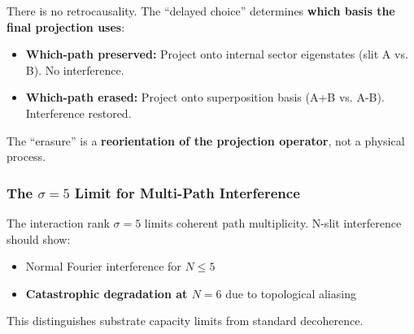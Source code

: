 There is no retrocausality. The ``delayed choice'' determines \textbf{which basis the final projection uses}:
\begin{itemize}
    \item \textbf{Which-path preserved:} Project onto internal sector eigenstates (slit A vs. B). No interference.
    \item \textbf{Which-path erased:} Project onto superposition basis (A+B vs. A-B). Interference restored.
\end{itemize}
The ``erasure'' is a \textbf{reorientation of the projection operator}, not a physical process.

\subsubsection{The $\sigma = 5$ Limit for Multi-Path Interference}

The interaction rank $\sigma = 5$ limits coherent path multiplicity. N-slit interference should show:
\begin{itemize}
    \item Normal Fourier interference for $N \leq 5$
    \item \textbf{Catastrophic degradation at $N = 6$} due to topological aliasing
\end{itemize}
This distinguishes substrate capacity limits from standard decoherence.